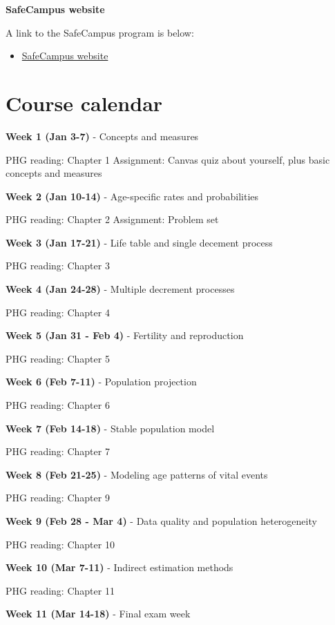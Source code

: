 \documentclass[
]{book}
\providecommand{\tightlist}{%
  \setlength{\itemsep}{0pt}\setlength{\parskip}{0pt}}
\begin{document}
\textbf{SafeCampus website}

A link to the SafeCampus program is below:

\begin{itemize}
\tightlist
\item
  \href{https://www.washington.edu/safecampus/}{SafeCampus website}
\end{itemize}

\hypertarget{course-calendar}{%
\section*{Course calendar}\label{course-calendar}}

{\textbf{Week 1 (Jan 3-7)} - Concepts and measures}

PHG reading: Chapter 1
Assignment: Canvas quiz about yourself, plus basic concepts and measures

{\textbf{Week 2 (Jan 10-14)} - Age-specific rates and probabilities}

PHG reading: Chapter 2
Assignment: Problem set

{\textbf{Week 3 (Jan 17-21)} - Life table and single decement process}

PHG reading: Chapter 3

{\textbf{Week 4 (Jan 24-28)} - Multiple decrement processes}

PHG reading: Chapter 4

{\textbf{Week 5 (Jan 31 - Feb 4)} - Fertility and reproduction}

PHG reading: Chapter 5

{\textbf{Week 6 (Feb 7-11)} - Population projection}

PHG reading: Chapter 6

{\textbf{Week 7 (Feb 14-18)} - Stable population model}

PHG reading: Chapter 7

{\textbf{Week 8 (Feb 21-25)} - Modeling age patterns of vital events}

PHG reading: Chapter 9

{\textbf{Week 9 (Feb 28 - Mar 4)} - Data quality and population heterogeneity}

PHG reading: Chapter 10

{\textbf{Week 10 (Mar 7-11)} - Indirect estimation methods}

PHG reading: Chapter 11

{\textbf{Week 11 (Mar 14-18)} - Final exam week}
\end{document}
